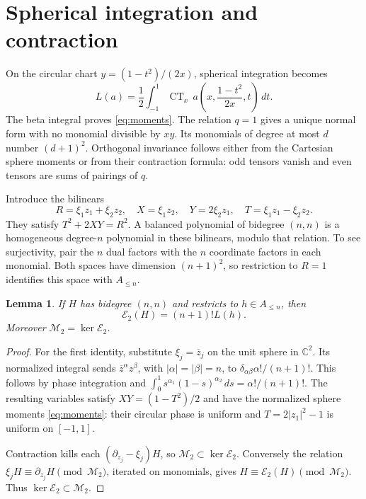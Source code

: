 \documentclass[11pt]{article}
\newcommand{\C}{\mathbb C}
\newcommand{\E}{\mathcal E_2}
\newcommand{\CT}{\operatorname{CT}}
\newcommand{\dd}{\,d}
\newtheorem{lemma}[theorem]{Lemma}
\theoremstyle{remark}\newtheorem{remark}[theorem]{Remark}
\begin{document}
\section{Spherical integration and contraction}\label{sec:bridge}

On the circular chart \(y=(1-t^2)/(2x)\), spherical integration becomes
\begin{equation}\label{eq:ct}
 L(a)=\frac12\int_{-1}^1
 \CT_x\,a\left(x,\frac{1-t^2}{2x},t\right)\dd t.
\end{equation}
The beta integral proves \eqref{eq:moments}. The relation \(q=1\)
gives a unique normal form with no monomial divisible by \(xy\).
Its monomials of degree at most \(d\) number \((d+1)^2\).
Orthogonal invariance follows either from the Cartesian sphere
moments or from their contraction formula: odd tensors vanish and
even tensors are sums of pairings of \(q\).

Introduce the bilinears
\begin{equation}\label{eq:bilinears}
 R=\xi_1z_1+\xi_2z_2,\quad X=\xi_1z_2,\quad
 Y=2\xi_2z_1,\quad T=\xi_1z_1-\xi_2z_2.
\end{equation}
They satisfy \(T^2+2XY=R^2\). A balanced polynomial of bidegree
\((n,n)\) is a homogeneous degree-\(n\) polynomial in these bilinears,
modulo that relation. To see surjectivity, pair the \(n\) dual factors
with the \(n\) coordinate factors in each monomial. Both spaces have
dimension \((n+1)^2\), so restriction to \(R=1\) identifies this
space with \(A_{\leq n}\).

\begin{lemma}\label{lem:bridge}
If \(H\) has bidegree \((n,n)\) and restricts to \(h\in A_{\leq n}\),
then
\begin{equation}\label{eq:bridge}
 \E(H)=(n+1)!L(h).
\end{equation}
Moreover \(\mathcal M_2=\ker\E\).
\end{lemma}
\begin{proof}
For the first identity, substitute \(\xi_j=\overline z_j\) on the
unit sphere in \(\C^2\). Its normalized integral sends
\(\overline z^\alpha z^\beta\), with \(|\alpha|=|\beta|=n\), to
\(\delta_{\alpha\beta}\alpha!/(n+1)!\). This follows by phase
integration and \(\int_0^1s^{\alpha_1}(1-s)^{\alpha_2}\dd s
=\alpha!/(n+1)!\). The resulting variables satisfy \(XY=(1-T^2)/2\) and have the
normalized sphere moments \eqref{eq:moments}: their circular phase is
uniform and \(T=2|z_1|^2-1\) is uniform on \([-1,1]\).

Contraction kills each \((\partial_{z_j}-\xi_j)H\), so
\(\mathcal M_2\subset\ker\E\). Conversely the relation
\(\xi_j H\equiv\partial_{z_j}H\pmod{\mathcal M_2}\), iterated
on monomials, gives \(H\equiv\E(H)\pmod{\mathcal M_2}\).
Thus \(\ker\E\subset\mathcal M_2\).
\end{proof}
\end{document}
